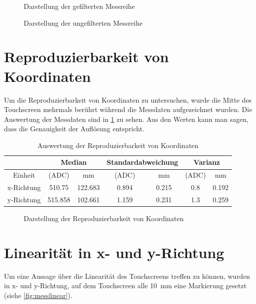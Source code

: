 \begin{figure}[ht!]
    \centering
    
    \caption{Darstellung der gefilterten Messreihe}
    \label{fig:filtered}
    \centering
    
    \caption{Darstellung der ungefilterten Messreihe}
    \label{fig:unfiltered}
\end{figure}

\newpage

\section{Reproduzierbarkeit von Koordinaten}
\label{ab:wiederholung}
Um die Reproduzierbarkeit von Koordinaten zu untersuchen, wurde die Mitte des Touchscreen mehrmals berührt während die Messdaten aufgezeichnet wurden.
Die Auswertung der Messdaten sind in \cref{tab:wiederholung} zu sehen.
Aus den Werten kann man sagen, dass die Genauigkeit der Auflösung entspricht.
\begin{table}[ht!]
    \caption{Auswertung der Reproduzierbarkeit von Koordinaten}
    \begin{center}
        \begin{tabular}{ |c|c|c|c|c|c|c| }
          \hline  
         &\multicolumn{2}{c|}{Median}& \multicolumn{2}{c|}{Standardabweichung}&\multicolumn{2}{c|}{Varianz} \\ \hline
         Einheit    &(ADC)              &mm             &(ADC)          &mm             &(ADC)          &mm\\\hline
         x-Richtung & \SI{510,75}{}    & \SI{122,683}{}&\SI{0,894}{}   &\SI{0,215}{}   &\SI{0,8}{}     & \SI{0,192}{} \\  \hline
         y-Richtung & \SI{515,858}{}    & \SI{102,661}{}&\SI{1,159}{}   &\SI{0,231}{}   &\SI{1,3}{}     & \SI{0,259}{} \\ \hline  
        \end{tabular}
        \label{tab:wiederholung}
    \end{center}   
\end{table}


\begin{figure}[ht!]
    \centering
    
    \caption{Darstellung der Reproduzierbarkeit von Koordinaten}
    \label{fig:wiederholung}
\end{figure}

\section{Linearität in x- und y-Richtung}
\label{ab:linear}
Um eine Aussage über die Linearität des Touchscreens treffen zu können, wurden in x- und y-Richtung, auf dem Touchscreen alle \SI{10}{mm} eine Markierung gesetzt (siehe \cref{fig:messlinear}).

